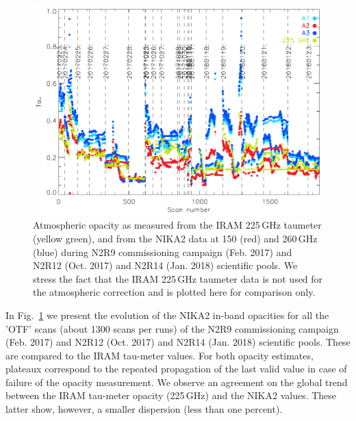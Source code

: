 \begin{figure}[ht]
\begin{center}
\includegraphics[scale=1.0]{Figures/opacity_evol_run_9_12_14.pdf}
\caption[Zenith opacity monitoring during N2R9, N2R12 and
  N2R14]{Atmospheric opacity as measured from the IRAM 225\,GHz
  taumeter (yellow green), and from the NIKA2 data at 150 (red) and
  260\,GHz (blue) during N2R9 commissioning campaign (Feb. 2017) and
  N2R12 (Oct. 2017) and N2R14 (Jan. 2018) scientific pools. We
  stress the fact that the IRAM 225\,GHz taumeter data is not used for
  the atmospheric correction and is plotted here for comparison only.
  \label{fig:taumeas}}
\end{center}
\end{figure}




In Fig.~\ref{fig:taumeas}  we present the evolution of the NIKA2 in-band
opacities for all the 'OTF' scans (about 1300 scans per runs) of the
N2R9 commissioning campaign (Feb. 2017) and N2R12 (Oct. 2017) and
N2R14 (Jan. 2018) scientific pools. These are compared to the IRAM
tau-meter values. For both opacity estimates, plateaux correspond to
the repeated propagation of the last valid value in case of failure of
the opacity measurement. We observe an agreement on the
global trend between the IRAM tau-meter opacity (225\,GHz) and the
NIKA2 values. These latter show, however, a smaller dispersion (less
than one percent).



